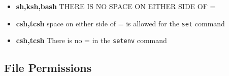 \documentclass[10pt,t]{beamer}
\begin{document}
\begin{frame}
\begin{itemize}
\begin{center}
    \end{center}
    \item \textbf{sh,ksh,bash} THERE IS NO SPACE ON EITHER SIDE OF =
    \item \textbf{csh,tcsh} space on either side of = is allowed for the \texttt{set} command
    \item \textbf{csh,tcsh} There is no = in the \texttt{setenv} command
  \end{itemize}
\end{frame}

\subsection{File Permissions}
\end{document}
